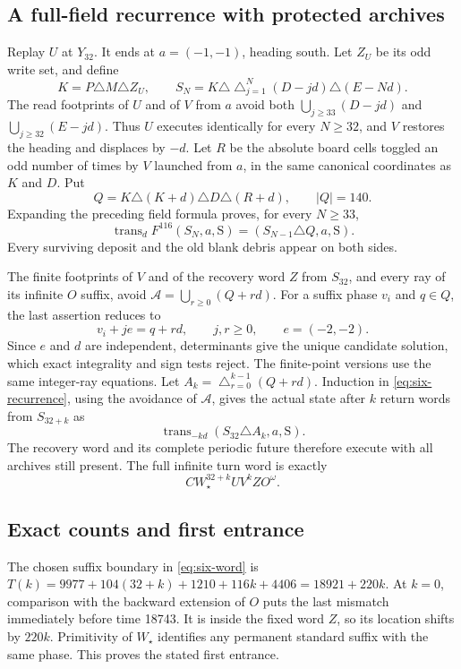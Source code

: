 \subsection{A full-field recurrence with protected archives}
Replay $U$ at $Y_{32}$. It ends at $a=(-1,-1)$, heading south. Let $Z_U$
be its odd write set, and define
\[
 K=P\triangle M\triangle Z_U,\qquad
 S_N=K\triangle\mathop{\triangle}_{j=1}^{N}(D-jd)\triangle(E-Nd).
\]
The read footprints of $U$ and of $V$ from $a$ avoid both
$\bigcup_{j\ge33}(D-jd)$ and $\bigcup_{j\ge32}(E-jd)$.
Thus $U$ executes identically for every $N\ge32$, and $V$ restores the
heading and displaces by $-d$. Let $R$ be the absolute board cells toggled an odd number of times by $V$
launched from $a$, in the same canonical coordinates as $K$ and $D$. Put
\[
 Q=K\triangle(K+d)\triangle D\triangle(R+d),\qquad |Q|=140.
\]
Expanding the preceding field formula proves, for every $N\ge33$,
\begin{equation}\label{eq:six-recurrence}
 \operatorname{trans}_{d}F^{116}(S_N,a,\mathrm S)
       =(S_{N-1}\triangle Q,a,\mathrm S).
\end{equation}
Every surviving deposit and the old blank debris appear on both sides.

The finite footprints of $V$ and of the recovery word $Z$ from $S_{32}$,
and every ray of its infinite $O$ suffix, avoid
$\mathcal A=\bigcup_{r\ge0}(Q+rd)$.
For a suffix phase $v_i$ and $q\in Q$, the last assertion reduces to
\[
 v_i+je=q+rd,\qquad j,r\ge0,\qquad e=(-2,-2).
\]
Since $e$ and $d$ are independent, determinants give the unique candidate
solution, which exact integrality and sign tests reject. The finite-point
versions use the same integer-ray equations.
Let $A_k=\mathop{\triangle}_{r=0}^{k-1}(Q+rd)$. Induction in
\eqref{eq:six-recurrence}, using the avoidance of $\mathcal A$, gives the
actual state after $k$ return words from $S_{32+k}$ as
\[
 \operatorname{trans}_{-kd}(S_{32}\triangle A_k,a,\mathrm S).
\]
The recovery word and its complete periodic future therefore execute with
all archives still present. The full infinite turn word is exactly
\begin{equation}\label{eq:six-word}
 CW_\star^{32+k}UV^kZO^\omega.
\end{equation}

\subsection{Exact counts and first entrance}
The chosen suffix boundary in \eqref{eq:six-word} is
$T(k)=9977+104(32+k)+1210+116k+4406=18921+220k$.
At $k=0$, comparison with the backward extension of $O$ puts the last
mismatch immediately before time 18743. It is inside the fixed word $Z$,
so its location shifts by $220k$. Primitivity of $W_\star$ identifies any permanent
standard suffix with the same phase. This proves the stated first entrance.

